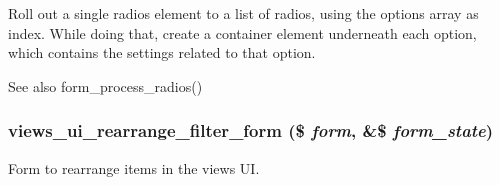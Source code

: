 Roll out a single radios element to a list of radios, using the options array as index. While doing that, create a container element underneath each option, which contains the settings related to that option.

\begin{DoxySeeAlso}{See also}
form\_\-process\_\-radios() 
\end{DoxySeeAlso}
\hypertarget{admin_8inc_aabfbb223593fede3af3dad2a87579505}{
\subsubsection[{views\_\-ui\_\-rearrange\_\-filter\_\-form}]{\setlength{\rightskip}{0pt plus 5cm}views\_\-ui\_\-rearrange\_\-filter\_\-form (\$ {\em form}, \/  \&\$ {\em form\_\-state})}}
\label{admin_8inc_aabfbb223593fede3af3dad2a87579505}
Form to rearrange items in the views UI. 

